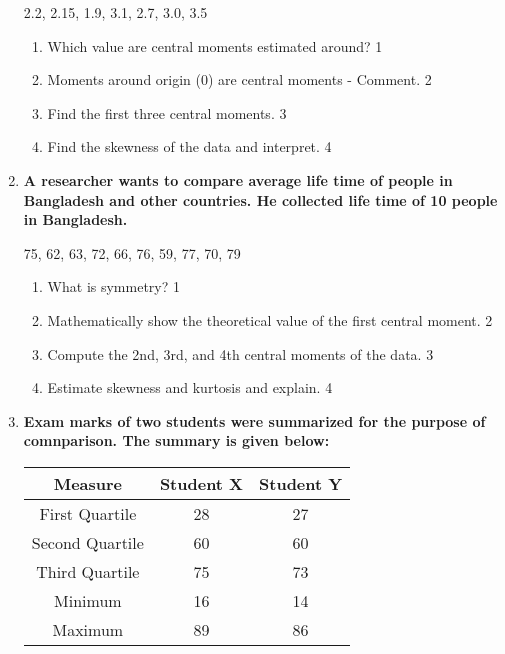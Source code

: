 \documentclass[a4paper,oneside]{book}
\begin{document}
\begin{enumerate}
	\begin{center}
	  2.2, 2.15, 1.9, 3.1, 2.7, 3.0, 3.5
	  	\end{center}
  
  \begin{enumerate}
    \item
	Which value are central moments estimated around? \hfill 1
    \item
	Moments around origin (0) are central moments - Comment. \hfill 2
    \item  
	Find the first three central moments. \hfill 3
    \item
	Find the skewness of the data and interpret.  \hfill 4
  \end{enumerate}
  

  
   \item
	  \textbf{A researcher wants to compare average life time of people in Bangladesh and other countries. He collected life time of 10 people in Bangladesh.} 
	  
	  	\begin{center}
	  75, 62, 63, 72, 66, 76, 59, 77, 70, 79
	  	\end{center}
  
  \begin{enumerate}
    \item
	What is symmetry? \hfill 1
    \item
	Mathematically show the theoretical value of the first central moment. \hfill 2
    \item  
	Compute the 2nd, 3rd, and 4th central moments of the data. \hfill 3
    \item
	Estimate skewness and kurtosis and explain. \hfill 4
  \end{enumerate}
  
   \item
	  \textbf{Exam marks of two students were summarized for the purpose of comnparison. The summary is given below:} 
	  
	  \begin{table}[h]
	  \centering
\begin{tabular}{c|c|c}
Measure         & Student X & Student Y \\ \hline
First Quartile  & 28        & 27        \\
Second Quartile & 60        & 60        \\
Third Quartile  & 75        & 73        \\
Minimum         & 16        & 14        \\ 
Maximum         & 89        & 86        \\  \hline
\end{tabular}
\end{table}
  

\end{enumerate}
\end{document}
